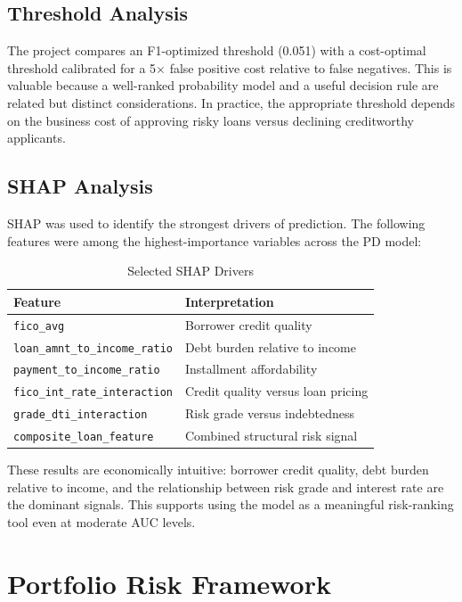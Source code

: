 \documentclass[12pt]{article}
\begin{document}
\subsection{Threshold Analysis}

The project compares an F1-optimized threshold (0.051) with a cost-optimal threshold calibrated for a 5$\times$ false positive cost relative to false negatives. This is valuable because a well-ranked probability model and a useful decision rule are related but distinct considerations. In practice, the appropriate threshold depends on the business cost of approving risky loans versus declining creditworthy applicants.

\subsection{SHAP Analysis}

SHAP was used to identify the strongest drivers of prediction. The following features were among the highest-importance variables across the PD model:

\begin{table}[H]
\centering
\caption{Selected SHAP Drivers}
\begin{tabular}{ll}
\toprule
Feature & Interpretation \\
\midrule
\texttt{fico\_avg} & Borrower credit quality \\
\texttt{loan\_amnt\_to\_income\_ratio} & Debt burden relative to income \\
\texttt{payment\_to\_income\_ratio} & Installment affordability \\
\texttt{fico\_int\_rate\_interaction} & Credit quality versus loan pricing \\
\texttt{grade\_dti\_interaction} & Risk grade versus indebtedness \\
\texttt{composite\_loan\_feature} & Combined structural risk signal \\
\bottomrule
\end{tabular}
\end{table}

These results are economically intuitive: borrower credit quality, debt burden relative to income, and the relationship between risk grade and interest rate are the dominant signals. This supports using the model as a meaningful risk-ranking tool even at moderate AUC levels.

\section{Portfolio Risk Framework}
\end{document}
